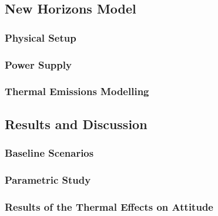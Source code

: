  {\small\textit{\lipsum[1-2]}}

\subsection{New Horizons Model}
\label{sec:NH_Model}

 {\small\textit{\lipsum[1-2]}}

\subsubsection{Physical Setup}

 {\small\textit{\lipsum[1-2]}}

\subsubsection{Power Supply}
\label{subsec:Power_Supply}

 {\small\textit{\lipsum[1-2]}}

\subsubsection{Thermal Emissions Modelling}
\label{sec:Initial_Study}

 {\small\textit{\lipsum[1-2]}}

\subsection{Results and Discussion}
\label{sec:Results_Discussion}

 {\small\textit{\lipsum[1-2]}}

\subsubsection{Baseline Scenarios}
\label{subsec:Scenarios}

 {\small\textit{\lipsum[1-2]}}

\subsubsection{Parametric Study}
\label{subsec:parametric_study}

 {\small\textit{\lipsum[1-2]}}

\subsubsection{Results of the Thermal Effects on Attitude}
\label{sec:attitude_results}

 {\small\textit{\lipsum[1-2]}}



